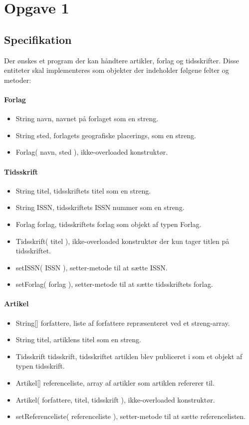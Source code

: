 \section{Opgave 1}

\subsection{Specifikation}
Der ønskes et program der kan håndtere artikler, forlag og tidsskrifter. Disse entiteter skal implementeres
som objekter der indeholder følgene felter og metoder:
\paragraph{Forlag}
\begin{itemize}
    \item String navn, navnet på forlaget som en streng.
    \item String sted, forlagets geografiske placerings, som en streng.
    \item Forlag( navn, sted ), ikke-overloaded konstruktør.
\end{itemize}

\paragraph{Tidsskrift}
\begin{itemize}
    \item String titel, tidsskriftets titel som en streng.
    \item String ISSN, tidsskriftets ISSN nummer som en streng.
    \item Forlag forlag, tidsskriftets forlag som objekt af typen Forlag.
    \item Tidsskrift( titel ), ikke-overloaded konstruktør der kun tager titlen på tidsskriftet.
    \item setISSN( ISSN ), setter-metode til at sætte ISSN.
    \item setForlag( forlag ), setter-metode til at sætte tidsskriftets forlag.
\end{itemize}

\paragraph{Artikel}
\begin{itemize}
    \item String[] forfattere, liste af forfattere repræsenteret ved et streng-array.
    \item String titel, artiklens titel som en streng.
    \item Tidsskrift tidsskrift, tidsskriftet artiklen blev publiceret i som et objekt af typen tidsskrift.
    \item Artikel[] referenceliste, array af artikler som artiklen refererer til.
    \item Artikel( forfattere, titel, tidsskrift ), ikke-overloaded konstruktør.
    \item setReferenceliste( referenceliste ), setter-metode til at sætte referencelisten.
\end{itemize}

